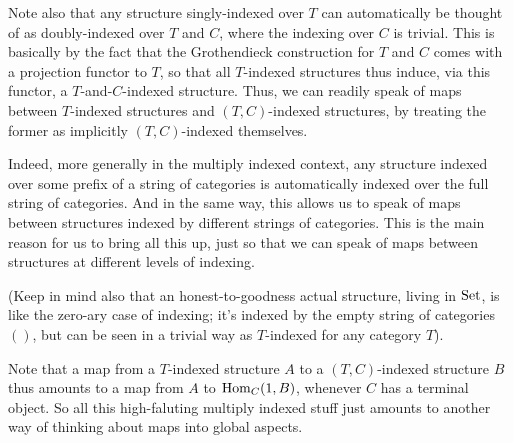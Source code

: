 
Note also that any structure singly-indexed over $T$ can automatically be thought of as doubly-indexed over $T$ and $C$, where the indexing over $C$ is trivial. This is basically by the fact that the Grothendieck construction for $T$ and $C$ comes with a projection functor to $T$, so that all $T$-indexed structures thus induce, via this functor, a $T$-and-$C$-indexed structure. Thus, we can readily speak of maps between $T$-indexed structures and $(T, C)$-indexed structures, by treating the former as implicitly $(T, C)$-indexed themselves.

Indeed, more generally in the multiply indexed context, any structure indexed over some prefix of a string of categories is automatically indexed over the full string of categories. And in the same way, this allows us to speak of maps between structures indexed by different strings of categories. This is the main reason for us to bring all this up, just so that we can speak of maps between structures at different levels of indexing.

(Keep in mind also that an honest-to-goodness actual structure, living in $\mathrm{Set}$, is like the zero-ary case of indexing; it's indexed by the empty string of categories $()$, but can be seen in a trivial way as $T$-indexed for any category $T$).

Note that a map from a $T$-indexed structure $A$ to a $(T, C)$-indexed structure $B$ thus amounts to a map from $A$ to $\operatorname{Hom}_C(1, B)$, whenever $C$ has a terminal object. So all this high-faluting multiply indexed stuff just amounts to another way of thinking about maps into global aspects.
